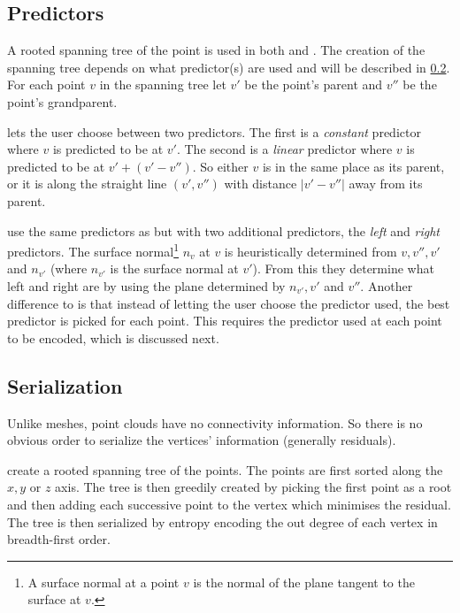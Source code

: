 \documentclass{report}
\begin{document}

\subsection{Predictors}

A rooted spanning tree of the point is used in both \citep{gumholdcomp} and
\citep{merrycomp}. The creation of the spanning tree depends on what
predictor(s) are used and will be described in \ref{sec:serialization}. For
each point $v$ in the spanning tree let $v'$ be the point's parent and $v''$
be the point's grandparent.

\citep{gumholdcomp} lets the user choose between two predictors. The first is
a \emph{constant} predictor where $v$ is predicted to be at $v'$. The second
is a \emph{linear} predictor where $v$ is predicted to be at $v' + (v' -
v'')$. So either $v$ is in the same place as its parent, or it is along the
straight line $(v', v'')$ with distance $|v'-v''|$ away from its parent.

\citep{merrycomp} use the same predictors as \citep{gumholdcomp} but with two
additional predictors, the \emph{left} and \emph{right} predictors. The
surface normal\footnote{A surface normal at a point $v$ is the normal of the
  plane tangent to the surface at $v$.} $n_v$ at $v$ is heuristically
determined from $v, v'', v'$ and $n_{v'}$ (where $n_{v'}$ is the surface
normal at $v'$). From this they determine what left and right are by using the
plane determined by $n_{v'}, v'$ and $v''$. Another difference to
\citep{gumholdcomp} is that instead of letting the user choose the
predictor used, the best predictor is picked for each point. This requires the
predictor used at each point to be encoded, which is discussed next.


\subsection{Serialization}
\label{sec:serialization}

Unlike meshes, point clouds have no connectivity information. So there is no
obvious order to serialize the vertices' information (generally residuals).

\citep{gumholdcomp} create a rooted spanning tree of the points. The points
are first sorted along the $x, y$ or $z$ axis. The tree is then greedily
created by picking the first point as a root and then adding each successive
point to the vertex which minimises the residual. The tree is then serialized
by entropy encoding the out degree of each vertex in breadth-first order.
\end{document}
